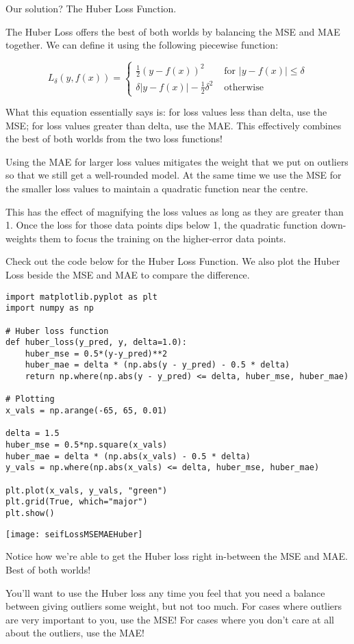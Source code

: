 Our solution? 
The Huber Loss Function.

The Huber Loss offers the best of both worlds by balancing the MSE and MAE together. We can define it using the following piecewise function:

\begin{equation}
L_{\delta}(y, f(x))=\left\{\begin{array}{ll}{\frac{1}{2}(y-f(x))^{2}} & {\text { for }|y-f(x)| \leq \delta} \\ {\delta|y-f(x)|-\frac{1}{2} \delta^{2}} & {\text { otherwise }}\end{array}\right.
\end{equation}

What this equation essentially says is: for loss values less than delta, use the MSE; for loss values greater than delta, use the MAE. This effectively combines the best of both worlds from the two loss functions!

Using the MAE for larger loss values mitigates the weight that we put on outliers so that we still get a well-rounded model. At the same time we use the MSE for the smaller loss values to maintain a quadratic function near the centre.

This has the effect of magnifying the loss values as long as they are greater than 1. Once the loss for those data points dips below 1, the quadratic function down-weights them to focus the training on the higher-error data points.

Check out the code below for the Huber Loss Function. We also plot the Huber Loss beside the MSE and MAE to compare the difference.


\begin{lstlisting}
import matplotlib.pyplot as plt
import numpy as np

# Huber loss function
def huber_loss(y_pred, y, delta=1.0):
    huber_mse = 0.5*(y-y_pred)**2
    huber_mae = delta * (np.abs(y - y_pred) - 0.5 * delta)
    return np.where(np.abs(y - y_pred) <= delta, huber_mse, huber_mae)
    
# Plotting
x_vals = np.arange(-65, 65, 0.01)

delta = 1.5
huber_mse = 0.5*np.square(x_vals)
huber_mae = delta * (np.abs(x_vals) - 0.5 * delta)
y_vals = np.where(np.abs(x_vals) <= delta, huber_mse, huber_mae)

plt.plot(x_vals, y_vals, "green")
plt.grid(True, which="major")
plt.show()
\end{lstlisting}

\begin{marginfigure}
\texttt{[image: seifLossMSEMAEHuber]}
\end{marginfigure}

Notice how we're able to get the Huber loss right in-between the MSE and MAE.
Best of both worlds!

You'll want to use the Huber loss any time you feel that you need a balance between giving outliers some weight, but not too much. For cases where outliers are very important to you, use the MSE! For cases where you don't care at all about the outliers, use the MAE!
